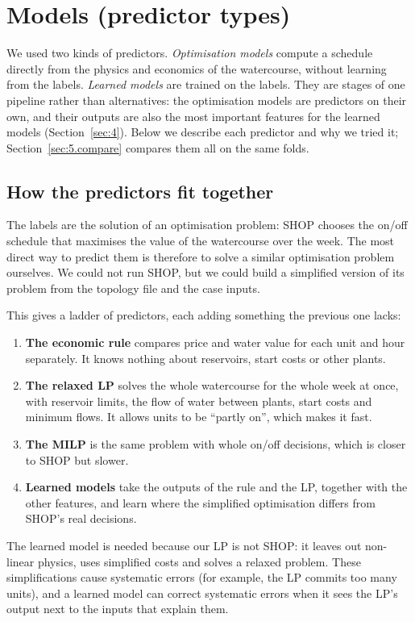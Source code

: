 \section{Models (predictor types)}\label{sec:5}

We used two kinds of predictors. \emph{Optimisation models} compute a schedule directly from the physics and economics of the watercourse, without learning from the labels. \emph{Learned models} are trained on the labels. They are stages of one pipeline rather than alternatives: the optimisation models are predictors on their own, and their outputs are also the most important features for the learned models (Section~\ref{sec:4}). Below we describe each predictor and why we tried it; Section~\ref{sec:5.compare} compares them all on the same folds.

\subsection{How the predictors fit together}\label{sec:5.overview}

The labels are the solution of an optimisation problem: SHOP chooses the on/off schedule that maximises the value of the watercourse over the week. The most direct way to predict them is therefore to solve a similar optimisation problem ourselves. We could not run SHOP, but we could build a simplified version of its problem from the topology file and the case inputs.

This gives a ladder of predictors, each adding something the previous one lacks:
\begin{enumerate}
  \item \textbf{The economic rule} compares price and water value for each unit and hour separately. It knows nothing about reservoirs, start costs or other plants.
  \item \textbf{The relaxed LP} solves the whole watercourse for the whole week at once, with reservoir limits, the flow of water between plants, start costs and minimum flows. It allows units to be ``partly on'', which makes it fast.
  \item \textbf{The MILP} is the same problem with whole on/off decisions, which is closer to SHOP but slower.
  \item \textbf{Learned models} take the outputs of the rule and the LP, together with the other features, and learn where the simplified optimisation differs from SHOP's real decisions.
\end{enumerate}
The learned model is needed because our LP is not SHOP: it leaves out non-linear physics, uses simplified costs and solves a relaxed problem. These simplifications cause systematic errors (for example, the LP commits too many units), and a learned model can correct systematic errors when it sees the LP's output next to the inputs that explain them.

